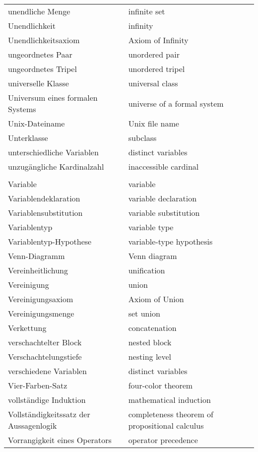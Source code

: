 \begin{longtabu}   { @{} X[l] X[l] }
    unendliche Menge & infinite set \\
    Unendlichkeit & infinity \\
    Unendlichkeitsaxiom & Axiom of Infinity  \\
    ungeordnetes Paar & unordered pair \\
    ungeordnetes Tripel & unordered tripel \\
    universelle Klasse & universal class \\
    Universum eines formalen Systems & universe of a formal system \\
    Unix-Dateiname & Unix file name \\
    Unterklasse & subclass \\
    unterschiedliche Variablen & distinct variables \\
    unzugängliche Kardinalzahl & inaccessible cardinal \\
     & \\
    Variable & variable \\
    Variablendeklaration & variable declaration \\
    Variablensubstitution & variable substitution \\
    Variablentyp & variable type \\
    Variablentyp-Hypothese & variable-type hypothesis \\
    Venn-Diagramm & Venn diagram \\
    Vereinheitlichung & unification \\
    Vereinigung & union \\
    Vereinigungsaxiom & Axiom of Union \\
    Vereinigungsmenge & set union \\
    Verkettung & concatenation \\
    verschachtelter Block & nested block \\
    Verschachtelungstiefe & nesting level \\
    verschiedene Variablen & distinct variables \\
    Vier-Farben-Satz & four-color theorem \\
    vollständige Induktion & mathematical induction \\
    \hangindent=0.5cm Vollständigkeitssatz der Aussagenlogik\vspace{2pt} & completeness theorem of propositional calculus \\
    Vorrangigkeit eines Operators & operator precedence \\

\end{longtabu}
